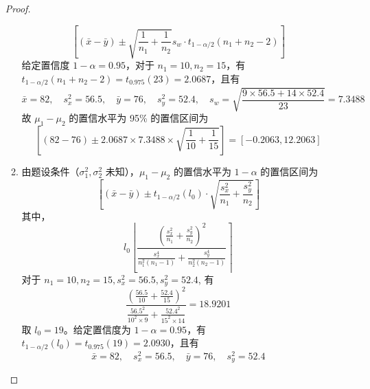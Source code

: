 \documentclass[normal,cn]{elegantnote}
\begin{document}
\begin{enumerate}
\begin{proof}
\begin{enumerate}
\begin{equation*}
                          \left[\left(\bar{x}-\bar{y}\right) \pm \sqrt{\frac{1}{n_{1}}+\frac{1}{n_{2}}}s_{w}\cdot t_{1-\alpha/2}\left(n_{1}+n_{2}-2\right)\right]
                      \end{equation*}
                      给定置信度 $1-\alpha=0.95$，对于 $n_{1}=10,n_{2}=15$，有 $t_{1-\alpha/2}\left(n_{1}+n_{2}-2\right)=t_{0.975}(23)=2.0687$，且有
                      \begin{equation*}
                          \bar{x}=82,\quad s_{x}^{2}=56.5,\quad \bar{y}=76,\quad s_{y}^{2}=52.4,\quad s_{w}=\sqrt{\frac{9\times 56.5+14 \times 52.4}{23}}=7.3488
                      \end{equation*}
                      故 $\mu_{1}-\mu_{2}$ 的置信水平为 95\% 的置信区间为
                      \begin{equation*}
                          \left[\left(82-76\right) \pm 2.0687 \times 7.3488 \times \sqrt{\frac{1}{10}+\frac{1}{15}}\right]=[-0.2063,12.2063]
                      \end{equation*}
                \item 由题设条件（$\sigma_{1}^{2},\sigma_{2}^{2}$ 未知），$\mu_{1}-\mu_{2}$ 的置信水平为 $1-\alpha$ 的置信区间为
                      \begin{equation*}
                          \left[\left(\bar{x}-\bar{y}\right) \pm t_{1-\alpha/2}\left(l_{0}\right)\cdot\sqrt{\frac{s_{x}^{2}}{n_{1}}+\frac{s_{y}^{2}}{n_{2}}}\right]
                      \end{equation*}
                      其中，
                      \begin{equation*}
                          l_{0}\left\lfloor\frac{\left(\frac{s_{x}^{2}}{n_{1}}+\frac{s_{y}^{2}}{n_{2}}\right)^{2}}{\frac{s_{x}^{4}}{n_{1}^{2}\left(n_{1}-1\right)}+\frac{s_{y}^{4}}{n_{2}^{2}\left(n_{2}-1\right)}}\right\rceil
                      \end{equation*}
                      对于 $n_{1}=10,n_{2}=15,s_{x}^{2}=56.5,s_{y}^{2}=52.4$, 有
                      \begin{equation*}
                          \frac{\left(\frac{56.5}{10}+\frac{52.4}{15}\right)^{2}}{\frac{56.5^{2}}{10^{2}\times 9}+\frac{52.4^{2}}{15^{2}\times 14}}=18.9201
                      \end{equation*}
                      取 $l_{0}=19$。给定置信度为 $1-\alpha=0.95$，有 $t_{1-\alpha/2}\left(l_{0}\right)=t_{0.975}(19)=2.0930$，且有
                      \begin{equation*}
                          \bar{x}=82,\quad s_{x}^{2}=56.5,\quad \bar{y}=76,\quad s_{y}^{2}=52.4

\end{equation*}
\end{enumerate}
\end{proof}
\end{enumerate}
\end{document}
